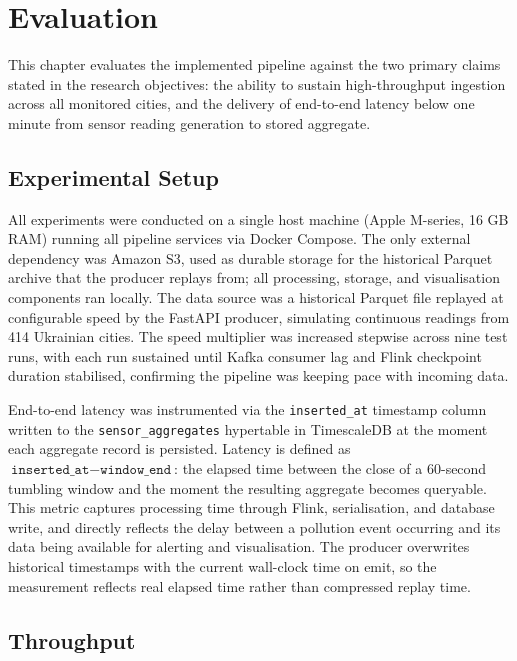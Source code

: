 \chapter{Evaluation}
\label{ch:evaluation}

This chapter evaluates the implemented pipeline against the two primary claims stated in the research objectives: the ability to sustain high-throughput ingestion across all monitored cities, and the delivery of end-to-end latency below one minute from sensor reading generation to stored aggregate.

\section{Experimental Setup}

All experiments were conducted on a single host machine (Apple M-series, 16 GB RAM) running all pipeline services via Docker Compose. The only external dependency was Amazon S3, used as durable storage for the historical Parquet archive that the producer replays from; all processing, storage, and visualisation components ran locally. The data source was a historical Parquet file replayed at configurable speed by the FastAPI producer, simulating continuous readings from 414 Ukrainian cities. The speed multiplier was increased stepwise across nine test runs, with each run sustained until Kafka consumer lag and Flink checkpoint duration stabilised, confirming the pipeline was keeping pace with incoming data.

End-to-end latency was instrumented via the \texttt{inserted\_at} timestamp column written to the \texttt{sensor\_aggregates} hypertable in TimescaleDB at the moment each aggregate record is persisted. Latency is defined as $\texttt{inserted\_at} - \texttt{window\_end}$: the elapsed time between the close of a 60-second tumbling window and the moment the resulting aggregate becomes queryable. This metric captures processing time through Flink, serialisation, and database write, and directly reflects the delay between a pollution event occurring and its data being available for alerting and visualisation. The producer overwrites historical timestamps with the current wall-clock time on emit, so the measurement reflects real elapsed time rather than compressed replay time.

\section{Throughput}

